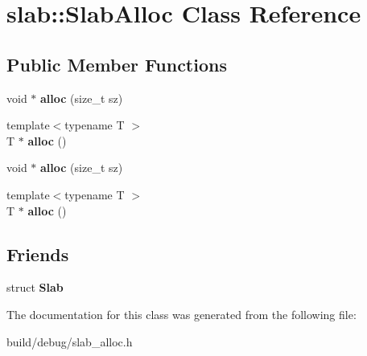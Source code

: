\hypertarget{classslab_1_1SlabAlloc}{\section{slab\-:\-:Slab\-Alloc Class Reference}
\label{classslab_1_1SlabAlloc}
}
\subsection*{Public Member Functions}
\begin{DoxyCompactItemize}
\item 
\hypertarget{classslab_1_1SlabAlloc_a4d40d4973ac3a7d3fa21ca07498a1185}{void $\ast$ {\bfseries alloc} (size\-\_\-t sz)}\label{classslab_1_1SlabAlloc_a4d40d4973ac3a7d3fa21ca07498a1185}

\item 
\hypertarget{classslab_1_1SlabAlloc_a444c0a89148ca2efe19032f9151d25bb}{{\footnotesize template$<$typename T $>$ }\\T $\ast$ {\bfseries alloc} ()}\label{classslab_1_1SlabAlloc_a444c0a89148ca2efe19032f9151d25bb}

\item 
\hypertarget{classslab_1_1SlabAlloc_a4d40d4973ac3a7d3fa21ca07498a1185}{void $\ast$ {\bfseries alloc} (size\-\_\-t sz)}\label{classslab_1_1SlabAlloc_a4d40d4973ac3a7d3fa21ca07498a1185}

\item 
\hypertarget{classslab_1_1SlabAlloc_a444c0a89148ca2efe19032f9151d25bb}{{\footnotesize template$<$typename T $>$ }\\T $\ast$ {\bfseries alloc} ()}\label{classslab_1_1SlabAlloc_a444c0a89148ca2efe19032f9151d25bb}

\end{DoxyCompactItemize}
\subsection*{Friends}
\begin{DoxyCompactItemize}
\item 
\hypertarget{classslab_1_1SlabAlloc_a6caff6d0160e5e69fa26d322202d3ab3}{struct {\bfseries Slab}}\label{classslab_1_1SlabAlloc_a6caff6d0160e5e69fa26d322202d3ab3}

\end{DoxyCompactItemize}


The documentation for this class was generated from the following file\-:\begin{DoxyCompactItemize}
\item 
build/debug/slab\-\_\-alloc.\-h\end{DoxyCompactItemize}
